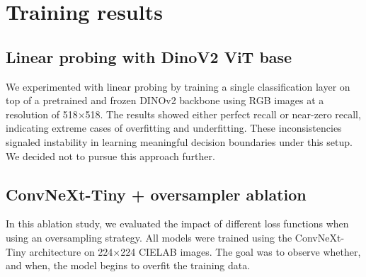 \chapter{Training results}
\label{ap:model_results}

\section{Linear probing with DinoV2 ViT base}

We experimented with linear probing by training a single classification layer on top of a pretrained and frozen DINOv2 backbone using RGB images at a resolution of 518×518. The results showed either perfect recall or near-zero recall, indicating extreme cases of overfitting and underfitting. These inconsistencies signaled instability in learning meaningful decision boundaries under this setup. We decided not to pursue this approach further.

\begin{table}[H]
\centering
\caption{Performance metrics for DINO base linear probing at 518x518 resolution (RGB images)}
\label{tab:dino-results}
\end{table}

\section{ConvNeXt-Tiny + oversampler ablation}
In this ablation study, we evaluated the impact of different loss functions when using an oversampling strategy. All models were trained using the ConvNeXt-Tiny architecture on 224×224 CIELAB images. The goal was to observe whether, and when, the model begins to overfit the training data.

